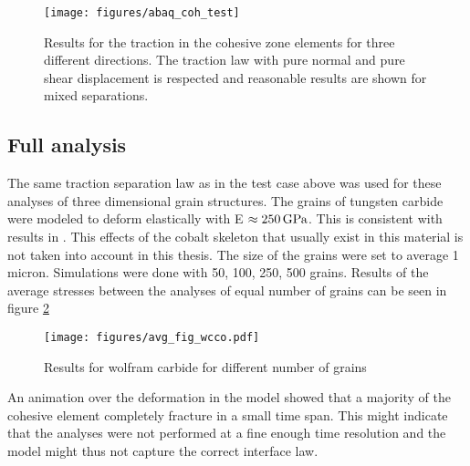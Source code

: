 \documentclass[wcco.tex]{subfiles}
\begin{document}
\begin{figure}[ht]
\centering
\texttt{[image: figures/abaq\_coh\_test]}
\caption{Results for the traction in the cohesive zone elements for three different directions. The traction law with pure normal and pure shear displacement is respected and reasonable results are shown for mixed separations. }
\label{fig:test_cases}
\end{figure}


\subsection{Full analysis}

The same traction separation law as in the test case above was used for these analyses of three dimensional grain structures. The grains of tungsten carbide were modeled to deform elastically with E $\approx \unit[250]{GPa}$. This is consistent with results in \cite{Buss04}. This effects of the cobalt skeleton that usually exist in this material is not taken into account in this thesis. The size of the grains were set to average 1 micron. Simulations were done with 50, 100, 250, 500 grains. Results of the average stresses between the analyses of equal number of grains can be seen in figure \ref{fig:wcco_res}

\begin{figure}[ht]
\centering
\texttt{[image: figures/avg\_fig\_wcco.pdf]}
\caption{Results for wolfram carbide for different number of grains}
\label{fig:wcco_res}
\end{figure}

An animation over the deformation in the model showed that a majority of the cohesive element completely fracture in a small time span. This might indicate that the analyses were not performed at a fine enough time resolution and the model might thus not capture the correct interface law.
\end{document}

